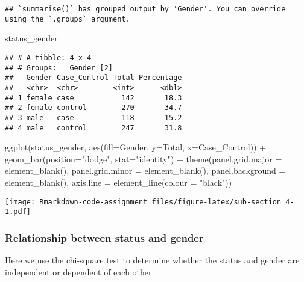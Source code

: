 \documentclass[
]{article}
\newenvironment{Shaded}{\begin{snugshade}}{\end{snugshade}}
\newcommand{\AttributeTok}[1]{\textcolor[rgb]{0.77,0.63,0.00}{#1}}
\newcommand{\FunctionTok}[1]{\textcolor[rgb]{0.00,0.00,0.00}{#1}}
\newcommand{\NormalTok}[1]{#1}
\newcommand{\SpecialCharTok}[1]{\textcolor[rgb]{0.00,0.00,0.00}{#1}}
\newcommand{\StringTok}[1]{\textcolor[rgb]{0.31,0.60,0.02}{#1}}
\begin{document}
\begin{verbatim}
## `summarise()` has grouped output by 'Gender'. You can override using the `.groups` argument.
\end{verbatim}

\begin{Shaded}
\begin{Highlighting}[]
\NormalTok{status\_gender}
\end{Highlighting}
\end{Shaded}

\begin{verbatim}
## # A tibble: 4 x 4
## # Groups:   Gender [2]
##   Gender Case_Control Total Percentage
##   <chr>  <chr>        <int>      <dbl>
## 1 female case           142       18.3
## 2 female control        270       34.7
## 3 male   case           118       15.2
## 4 male   control        247       31.8
\end{verbatim}

\begin{Shaded}
\begin{Highlighting}[]
\FunctionTok{ggplot}\NormalTok{(status\_gender, }\FunctionTok{aes}\NormalTok{(}\AttributeTok{fill=}\NormalTok{Gender, }\AttributeTok{y=}\NormalTok{Total, }\AttributeTok{x=}\NormalTok{Case\_Control)) }\SpecialCharTok{+} 
  \FunctionTok{geom\_bar}\NormalTok{(}\AttributeTok{position=}\StringTok{"dodge"}\NormalTok{, }\AttributeTok{stat=}\StringTok{"identity"}\NormalTok{) }\SpecialCharTok{+} 
  \FunctionTok{theme}\NormalTok{(}\AttributeTok{panel.grid.major =} \FunctionTok{element\_blank}\NormalTok{(), }\AttributeTok{panel.grid.minor =} \FunctionTok{element\_blank}\NormalTok{(),}
        \AttributeTok{panel.background =} \FunctionTok{element\_blank}\NormalTok{(), }\AttributeTok{axis.line =} \FunctionTok{element\_line}\NormalTok{(}\AttributeTok{colour =} \StringTok{"black"}\NormalTok{))}
\end{Highlighting}
\end{Shaded}

\texttt{[image: Rmarkdown-code-assignment\_files/figure-latex/sub-section 4-1.pdf]}

\hypertarget{relationship-between-status-and-gender}{%
\subsubsection{Relationship between status and
gender}\label{relationship-between-status-and-gender}}

Here we use the chi-square test to determine whether the status and
gender are independent or dependent of each other.
\end{document}
